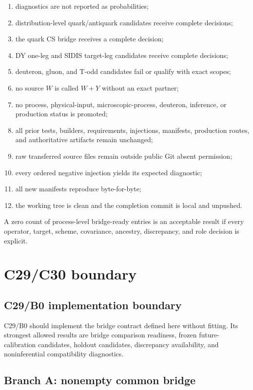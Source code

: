 \documentclass[11pt]{article}
\begin{document}
\begin{enumerate}
\item diagnostics are not reported as probabilities;
\item distribution-level quark/antiquark candidates receive complete decisions;
\item the quark CS bridge receives a complete decision;
\item DY one-leg and SIDIS target-leg candidates receive complete decisions;
\item deuteron, gluon, and T-odd candidates fail or qualify with exact scopes;
\item no source \(W\) is called \(W+Y\) without an exact partner;
\item no process, physical-input, microscopic-process, deuteron, inference, or production status is promoted;
\item all prior tests, builders, requirements, injections, manifests, production routes, and authoritative artifacts remain unchanged;
\item raw transferred source files remain outside public Git absent permission;
\item every ordered negative injection yields its expected diagnostic;
\item all new manifests reproduce byte-for-byte;
\item the working tree is clean and the completion commit is local and unpushed.
\end{enumerate}

A zero count of process-level bridge-ready entries is an acceptable result if every operator, target, scheme, covariance, ancestry, discrepancy, and role decision is explicit.

\section{C29/C30 boundary}
\label{sec:handoff}

\subsection{C29/B0 implementation boundary}

C29/B0 should implement the bridge contract defined here without fitting.  Its strongest allowed results are bridge comparison readiness, frozen future-calibration candidates, holdout candidates, discrepancy availability, and noninferential compatibility diagnostics.

\subsection{Branch A: nonempty common bridge}
\end{document}
